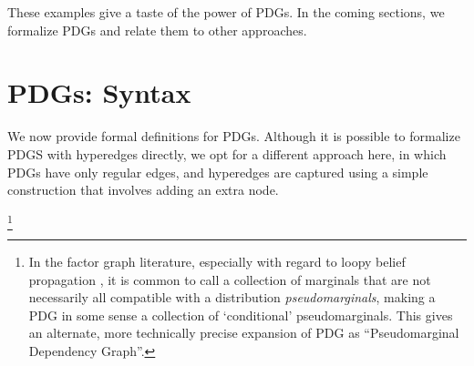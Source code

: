 \documentclass[letterpaper]{article} %
\theoremstyle{plain}
\theoremstyle{definition}
\theoremstyle{remark}
\newcommand{\vfullfootnote}[1]{}
\renewcommand{\vfullfootnote}[1]{\footnote{#1}}
\begin{document}
These examples give a taste of the power of PDGs.  In the coming sections, we formalize PDGs and relate them to other approaches.		
	
	
\section{PDGs: Syntax}\label{sec:formal+syntax}
We now provide formal definitions for PDGs.        
Although it is possible to formalize PDGS with hyperedges directly,
    we opt for a different approach here, in which PDGs have only regular edges,
and hyperedges are captured using a simple construction
that involves adding an extra node.

\vfullfootnote{In the factor graph literature,
          especially with regard to loopy belief propagation
          \cite{wainwright2007graphical}, it is common to
          call a collection of marginals that are not
          necessarily all compatible with a distribution
          \emph{pseudomarginals}, making a PDG in some sense a
          collection of `conditional' pseudomarginals. This
          gives an alternate, more technically precise
          expansion of PDG as ``Pseudomarginal Dependency Graph''.} 
\end{document}
